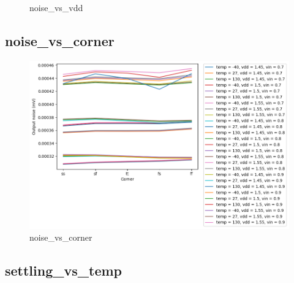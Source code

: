 \documentclass[
  a4paper,
  DIV=11,
  numbers=noendperiod]{scrartcl}
\begin{document}
\begin{tcolorbox}
\begin{figure}[H]
{}

\caption{noise\_vs\_vdd}

\end{figure}%

\subsection{noise\_vs\_corner}\label{noise_vs_corner}

\begin{figure}[H]

{\centering \includegraphics{./cace/_docs/ota-5t/schematic/noise_vs_corner.png}

}

\caption{noise\_vs\_corner}

\end{figure}%

\subsection{settling\_vs\_temp}\label{settling_vs_temp}

\begin{figure}[H]


\end{figure}
\end{tcolorbox}
\end{document}
